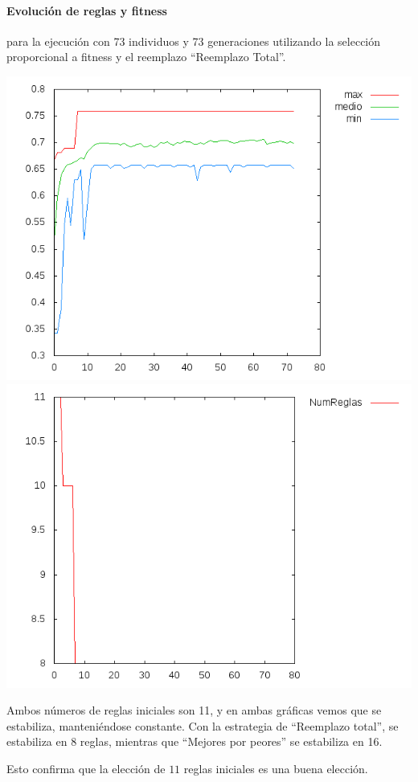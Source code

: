\documentclass[nochap]{apuntes}
\begin{document}
\paragraph{Evolución de reglas y fitness} para la ejecución con 73 individuos y 73 generaciones utilizando la selección proporcional a fitness y el reemplazo ``Reemplazo Total''.
\begin{center}
\includegraphics[scale=0.4]{tex/img/g73_p73_ReemplazoTotal_SeleccionProporcionalAlFitness_reg11.png}
\includegraphics[scale=0.4]{tex/img/g73_p73_ReemplazoTotal_SeleccionProporcionalAlFitness_reg11_reglas.png}
\end{center}

Ambos números de reglas iniciales son 11, y en ambas gráficas vemos que se estabiliza, manteniéndose constante. Con la estrategia de ``Reemplazo total'', se estabiliza en 8 reglas, mientras que ``Mejores por peores'' se estabiliza en 16.

Esto confirma que la elección de $11$ reglas iniciales es una buena elección.
\end{document}
